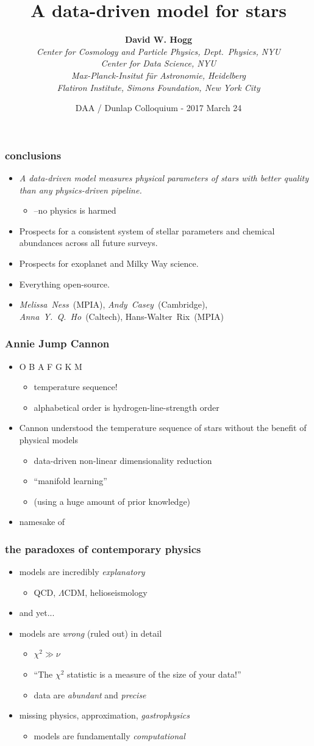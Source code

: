 \documentclass[pdftex]{beamer}
\title{A data-driven model for stars}
\author[David W. Hogg (NYU)]{\textbf{David W. Hogg} \\
  \textsl{\footnotesize Center for Cosmology and Particle Physics, Dept.~Physics, NYU} \\
  \textsl{\footnotesize Center for Data Science, NYU} \\
  \textsl{\footnotesize Max-Planck-Insitut f\"ur Astronomie, Heidelberg} \\
  \textsl{\footnotesize Flatiron Institute, Simons Foundation, New York City}}
\date{DAA / Dunlap Colloquium - 2017 March 24}
\newcommand{\conclusions}{%
\begin{frame}
  \frametitle{conclusions}
  \begin{itemize}
  \item \emph{A data-driven model measures physical parameters of stars with better quality than any physics-driven pipeline.}
    \begin{itemize}
    \item \tc\---no physics is harmed
    \end{itemize}
  \item Prospects for a consistent system of stellar parameters and chemical abundances across all future surveys.
  \item Prospects for exoplanet and Milky Way science.
  \item Everything open-source.
  \item \emph{Melissa~Ness}~(MPIA), \emph{Andy~Casey}~(Cambridge), \emph{Anna~Y.~Q.~Ho}~(Caltech), Hans-Walter~Rix~(MPIA)
  \end{itemize}
\end{frame}}
\begin{document}
\sloppy\sloppypar\raggedright\raggedbottom

\begin{frame}
  \titlepage
\end{frame}

\conclusions

\begin{frame}
  \frametitle{Annie Jump Cannon}
  \begin{itemize}
  \item O B A F G K M
    \begin{itemize}
    \item temperature sequence!
    \item alphabetical order is hydrogen-line-strength order
    \end{itemize}
  \item Cannon understood the temperature sequence of stars without the benefit of physical models
    \begin{itemize}
    \item data-driven non-linear dimensionality reduction
    \item ``manifold learning''
    \item (using a huge amount of prior knowledge)
    \end{itemize}
  \item namesake of \tc
  \end{itemize}
\end{frame}

\begin{frame}
  \frametitle{the paradoxes of contemporary physics}
  \begin{itemize}
  \item models are incredibly \emph{explanatory}
    \begin{itemize}
    \item QCD, $\Lambda$CDM, helioseismology
    \end{itemize}
  \item and yet...
  \item<2-> models are \emph{wrong} (ruled out) in detail
    \begin{itemize}
    \item $\chi^2 \gg \nu$
    \item ``The $\chi^2$ statistic is a measure of the size of your data!''
    \item data are \emph{abundant} and \emph{precise}
    \end{itemize}
  \item<3-> missing physics, approximation, \emph{gastrophysics}
    \begin{itemize}
    \item models are fundamentally \emph{computational}
    \end{itemize}
  \end{itemize}
\end{frame}
\end{document}
